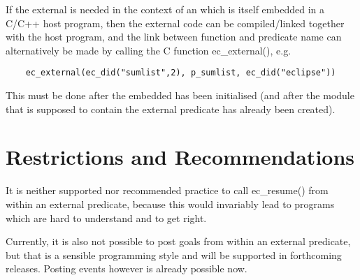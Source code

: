 If the external is needed in the context of an {\eclipse} which is itself
embedded in a C/C++ host program, then the external code can be
compiled/linked together with the host program, and the link between function
and predicate name can alternatively be made by calling the C function
ec_external(), e.g.
\begin{verbatim}
    ec_external(ec_did("sumlist",2), p_sumlist, ec_did("eclipse"))
\end{verbatim}
This must be done after the embedded {\eclipse} has been initialised
(and after the module that is supposed to contain the external predicate
has already been created).


\section{Restrictions and Recommendations}

It is neither supported nor recommended practice to call ec_resume()
from within an external predicate, because this would invariably lead
to programs which are hard to understand and to get right.

Currently, it is also not possible to post goals from within an
external predicate, but that is a sensible programming style and
will be supported in forthcoming releases.
Posting events however is already possible now.


